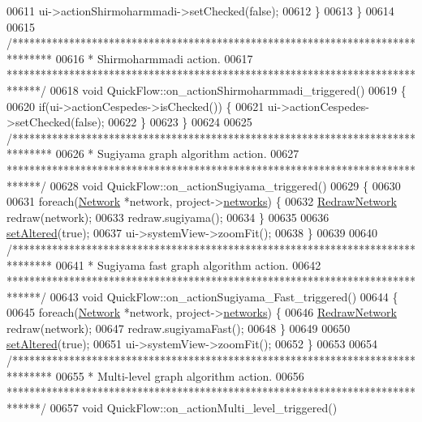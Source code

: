 \begin{DoxyCode}
00611     ui->actionShirmoharmmadi->setChecked(\textcolor{keyword}{false});
00612   \}
00613 \}
00614 
00615 \textcolor{comment}{/*******************************************************************************}
00616 \textcolor{comment}{ * Shirmoharmmadi action.}
00617 \textcolor{comment}{ ******************************************************************************/}
00618 \textcolor{keywordtype}{void} QuickFlow::on\_actionShirmoharmmadi\_triggered()
00619 \{
00620   \textcolor{keywordflow}{if}(ui->actionCespedes->isChecked()) \{
00621     ui->actionCespedes->setChecked(\textcolor{keyword}{false});
00622   \}
00623 \}
00624 
00625 \textcolor{comment}{/*******************************************************************************}
00626 \textcolor{comment}{ * Sugiyama graph algorithm action.}
00627 \textcolor{comment}{ ******************************************************************************/}
00628 \textcolor{keywordtype}{void} QuickFlow::on\_actionSugiyama\_triggered()
00629 \{
00630 
00631   \textcolor{keywordflow}{foreach}(\hyperlink{class_network}{Network} *network, project->\hyperlink{class_project_aa98126154cab59769a431668e6f17daf}{networks}) \{
00632     \hyperlink{class_redraw_network}{RedrawNetwork} redraw(network);
00633     redraw.sugiyama();
00634   \}
00635 
00636   \hyperlink{group___window_ga4b63ea5ca52a9eea14db0a22b5a133f8}{setAltered}(\textcolor{keyword}{true});
00637   ui->systemView->zoomFit();
00638 \}
00639 
00640 \textcolor{comment}{/*******************************************************************************}
00641 \textcolor{comment}{ * Sugiyama fast graph algorithm action.}
00642 \textcolor{comment}{ ******************************************************************************/}
00643 \textcolor{keywordtype}{void} QuickFlow::on\_actionSugiyama\_Fast\_triggered()
00644 \{
00645   \textcolor{keywordflow}{foreach}(\hyperlink{class_network}{Network} *network, project->\hyperlink{class_project_aa98126154cab59769a431668e6f17daf}{networks}) \{
00646     \hyperlink{class_redraw_network}{RedrawNetwork} redraw(network);
00647     redraw.sugiyamaFast();
00648   \}
00649 
00650   \hyperlink{group___window_ga4b63ea5ca52a9eea14db0a22b5a133f8}{setAltered}(\textcolor{keyword}{true});
00651   ui->systemView->zoomFit();
00652 \}
00653 
00654 \textcolor{comment}{/*******************************************************************************}
00655 \textcolor{comment}{ *  Multi-level graph algorithm action.}
00656 \textcolor{comment}{ ******************************************************************************/}
00657 \textcolor{keywordtype}{void} QuickFlow::on\_actionMulti\_level\_triggered()

\end{DoxyCode}
